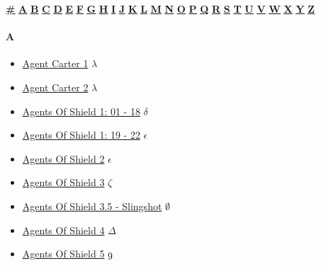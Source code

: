 \begin{center}
			\hyperlink{ST\#}{\textbf{\underline{\#}}}
			\hyperlink{STA}{\textbf{\underline{A}}} \hyperlink{STB}{\textbf{\underline{B}}} \hyperlink{STC}{\textbf{\underline{C}}} \hyperlink{STD}{\textbf{\underline{D}}} \hyperlink{STE}{\textbf{\underline{E}}} \hyperlink{STF}{\textbf{\underline{F}}} \hyperlink{STG}{\textbf{\underline{G}}} \hyperlink{STH}{\textbf{\underline{H}}} \hyperlink{STI}{\textbf{\underline{I}}} \hyperlink{STJ}{\textbf{\underline{J}}} \hyperlink{STK}{\textbf{\underline{K}}} \hyperlink{STL}{\textbf{\underline{L}}} \hyperlink{STM}{\textbf{\underline{M}}} \hyperlink{STN}{\textbf{\underline{N}}} \hyperlink{STO}{\textbf{\underline{O}}} \hyperlink{STP}{\textbf{\underline{P}}} \hyperlink{STQ}{\textbf{\underline{Q}}} \hyperlink{STR}{\textbf{\underline{R}}} \hyperlink{STS}{\textbf{\underline{S}}} \hyperlink{STT}{\textbf{\underline{T}}} \hyperlink{STU}{\textbf{\underline{U}}} \hyperlink{STV}{\textbf{\underline{V}}} \hyperlink{STW}{\textbf{\underline{W}}} \hyperlink{STX}{\textbf{\underline{X}}} \hyperlink{STY}{\textbf{\underline{Y}}} \hyperlink{STZ}{\textbf{\underline{Z}}}
		\end{center}
		
	\paragraph{A} \hypertarget{SA}{}
		\begin{itemize}
				
			\item \href{https://mega.nz/#F!zw4mQTQQ!6fxtB_EUvPGN2az_NE8jwg} {Agent Carter 1}  $\lambda$ \\ 
			\item \href{https://mega.nz/#F!1lI0HZrS!5VawpxKefqIp_A-zhTYyLg} {Agent Carter 2}  $\lambda$ \\ 	
			\item \href{https://mega.nz/#F!9IBEFJxT!de0lkzDs4jObm-gncO7sAQ} {Agents Of Shield 1: 01 - 18}  $\delta$ \\ 
			\item \href{https://mega.nz/#F!s4xX2DLS!Hiwmy0MivpDGiiOAQrxVFg} {Agents Of Shield 1: 19 - 22}  $\epsilon$ \\ 
			\item \href{https://mega.nz/#F!N1ISHSaI!ZUqng4M5AqNp7Ky-vhkh3g} {Agents Of Shield 2}  $\epsilon$ \\ 
			\item \href{https://mega.nz/#F!Xg1XyCrT!MTlMTe9gnb1NMhS3W1JXhg} {Agents Of Shield 3}  $\zeta$ \\
			\item \href{https://mega.nz/#F!QbJzSCJI!r6hkryupDIy6bpnR5hECDg} {Agents Of Shield 3.5 - Slingshot}  $\emptyset$ \\
			\item \href{https://mega.nz/#F!lqIwkRSa!UwJ76xLTIM4J4OBj99PbVA} {Agents Of Shield 4}  $\varDelta$ \\
			\item \href{https://mega.nz/#F!bPIy0ArC!KBEyDeV7Slyih40byqJtiA} {Agents Of Shield 5}  $\oldstylenums{9}$ \\ 
			
				
			\end{itemize}
	
